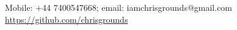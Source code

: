 \begin{center}
	Mobile: +44 7400547668; email: iamchrisgrounds@gmail.com\\
	\href{https://github.com/chris-bacon}{https://github.com/chrisgrounds}\\
\end{center}